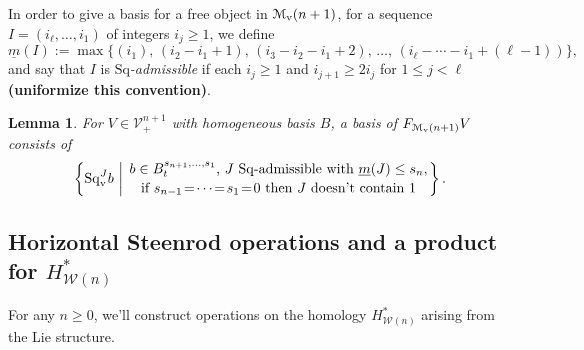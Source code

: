 \documentclass[11pt]{amsart}
\theoremstyle{plain}
\newtheorem{lem}[thm]{Lemma}
\theoremstyle{definition}
\newcommand{\calW}{\mathcal{W}}
\newcommand{\calV}{\mathcal{V}}
\newcommand{\calMv}{\mathcal{M}_\textup{v}}
\theoremstyle{plain}
\newcommand{\vect}[2]{\calV^{#1}_{#2}}
\newcommand{\minDimSq}{\underline{m}}
\newcommand{\Sq}{\mathrm{Sq}}
\begin{document}
\begin{Cohomology operations for all unstable Lie algebras}
In order to give a basis for a free object in $\calMv(n+1)$, for a sequence $I=(i_\ell,\ldots,i_1)$ of integers $i_j\geq1$, we define
\[\minDimSq(I):=\max\{(i_1),\,(i_2-i_1+1),\,(i_3-i_2-i_1+2),\,\ldots,\,(i_{\ell}-\cdots-i_1+(\ell-1))\},
\]
and say that $I$ is \emph{$\Sq$-admissible} if each $i_j\geq1$ and $i_{j+1}\geq 2i_j$ for $1\leq j <\ell$ \textbf{(uniformize this convention)}.
\begin{lem}
For $V\in\vect{n+1}{+}$ with homogeneous basis $B$, a basis of $F_{\calMv(n+1)}V$ consists of
\[\left\{\Sq^J_{\textup{v}}b\ \middle|\ \genfrac{}{}{0pt}{}{b\in B^{s_{n+1},\ldots,s_1}_t\textup{, $J$ $\Sq$-admissible with }\minDimSq(J)\leq s_n,}{\textup{if }s_{n-1}\!=\!\cdots\!=\!s_1\!=\!0\textup{ then $J$ doesn't contain 1}}\right\}.\]


\end{lem}

\subsection{Horizontal Steenrod operations and a product for $H^*_{\calW(n)}$}
For any $n\geq 0$, we'll construct operations on the homology $H^*_{\calW(n)}$ arising from the Lie structure.


\end{Cohomology operations for all unstable Lie algebras}
\end{document}
